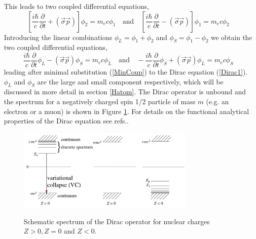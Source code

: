 \documentclass[12pt]{article}
\begin{document}
This leads to two coupled differential equations,
\begin{equation}
   \left[ \frac{i\hbar}{c} \frac{\partial}{\partial t} + \left(\vec{\sigma}\vec{p}\right) \right] \phi_2 = m_ec\phi_1
   \quad \text{and} \quad \left[ \frac{i\hbar}{c} \frac{\partial}{\partial t} - \left(\vec{\sigma}\vec{p}\right) \right]\phi_1 = m_ec\phi_2
   \label{QuantEnerMom2}
\end{equation}
Introducing the linear combinations $\phi_L=\phi_1+\phi_2$ and $\phi_S=\phi_1-\phi_2$ we obtain the two coupled differential equations,
\begin{equation}
   \frac{i\hbar}{c} \frac{\partial}{\partial t}\phi_L - \left(\vec{\sigma}\vec{p}\right) \phi_S = m_ec\phi_L
   \quad \text{and} \quad -\frac{i\hbar}{c} \frac{\partial}{\partial t}\phi_S + \left(\vec{\sigma}\vec{p}\right) \phi_L = m_ec\phi_S
   \label{DiracEq2}
\end{equation}   
leading after minimal substitution (\ref{MinCoup}) to the Dirac equation (\ref{Dirac1}). $\phi_L$ and $\phi_S$ are the large and small component respectively, which will be discussed in more detail in section \ref{Hatom}. The Dirac operator is unbound and the spectrum for a negatively charged spin 1/2 particle of mass $m$ (e.g. an electron or a muon) is shown in Figure \ref{fig:spec}. For details on the functional analytical properties of the Dirac equation see refs.\cite{Batz-1973,thaller-1992}.

\begin{figure}[htp!]
\centering
\includegraphics[height=40mm]{figspec.jpg}\\
\caption{Schematic spectrum of the Dirac operator for nuclear charges $Z>0, Z=0$ and $Z<0$.}
\label{fig:spec}
\end{figure}
\end{document}
